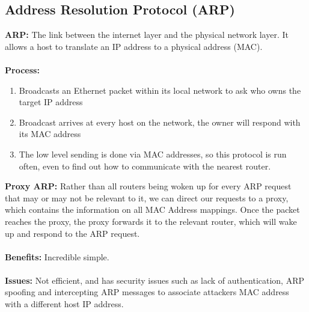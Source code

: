 \documentclass[a4paper,10pt]{article}
\begin{document}
\subsection{Address Resolution Protocol (ARP)} 
\textcolor{RubineRed}{\textbf{ARP:}} The link between the internet layer and the physical network layer. It allows a host to translate an IP address to a physical address (MAC). \\\\
\textcolor{RubineRed}{\textbf{Process:}}
\begin{enumerate}
	\item Broadcasts an Ethernet packet within its local network to ask who owns the target IP address
	\item Broadcast arrives at every host on the network, the owner will respond with its MAC address 
	\item The low level sending is done via MAC addresses, so this protocol is run often, even to find out how to communicate with the nearest router. 
\end{enumerate}
\textcolor{RubineRed}{\textbf{Proxy ARP:}} Rather than all routers being woken up for every ARP request that may or may not be relevant to it, we can direct our requests to a proxy, which contains the information on all MAC Address mappings. Once the packet reaches the proxy, the proxy forwards it to the relevant router, which will wake up and respond to the ARP request. \\\\
\textcolor{RubineRed}{\textbf{Benefits:}} Incredible simple. \\\\
\textcolor{RubineRed}{\textbf{Issues:}} Not efficient, and has security issues such as lack of authentication, ARP spoofing and intercepting ARP messages to associate attackers MAC address with a different host IP address. \\\\
\end{document}
